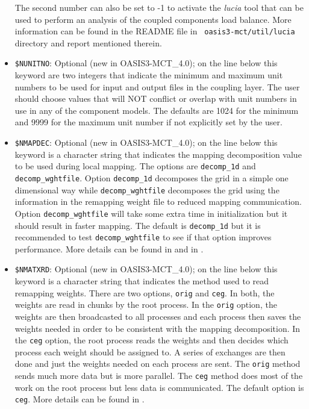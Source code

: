 \begin{itemize}
The second number can also be set to -1 to activate the {\it lucia}
tool that can be used to perform an analysis of the coupled components
load balance. More information can be found in the README file in {\tt
  oasis3-mct/util/lucia} directory and report mentioned therein.
 
\item {\tt \$NUNITNO}: Optional (new in OASIS3-MCT\_4.0); on the line below this keyword are two integers
  that indicate the minimum and maximum unit numbers to be used for
  input and output files in the coupling layer.  The user should
  choose values that will NOT conflict or overlap with unit numbers in 
  use in any of the component models. The defaults are 1024 for the minimum and 9999
  for the maximum unit number if not explicitly set by the user.

\item {\tt \$NMAPDEC}: Optional (new in OASIS3-MCT\_4.0); on the line below this keyword is a character string
  that indicates the mapping decomposition value to be used during local mapping.  The
  options are {\tt decomp\_1d} and {\tt decomp\_wghtfile}.  Option {\tt decomp\_1d} decomposes the grid in a simple
  one dimensional way while {\tt decomp\_wghtfile} decomposes the grid using the
  information in the remapping weight file to reduced mapping communication. Option {\tt decomp\_wghtfile}
  will take some extra time in initialization but it should result in faster mapping.
  The default is {\tt decomp\_1d} but it is recommended to test {\tt decomp\_wghtfile} to see if that
  option improves performance. More details can be found in \cite {craig 18} and in \cite{valcke11}.

\item {\tt \$NMATXRD}: Optional (new in OASIS3-MCT\_4.0); on the line below this keyword is a character string
  that indicates the method used to read remapping weights.  There are two options, {\tt orig}
  and {\tt ceg}.  In both, the weights are read in chunks by the root process.  In the {\tt orig} option, 
  the weights are then broadcasted to all processes and each process then saves the weights needed in
  order to be consistent with the mapping decomposition.  In the {\tt ceg} option, the root process 
  reads the weights and then decides which process each weight should be assigned to.  A
  series of exchanges are then done and just the weights needed on
  each process are sent.  The {\tt orig} method sends much more data but is more parallel.  The {\tt ceg}
  method does most of the work on the root process but less data is communicated.  The default option
  is {\tt ceg}. More details can be found in \cite {craig 18}.


\end{itemize}
